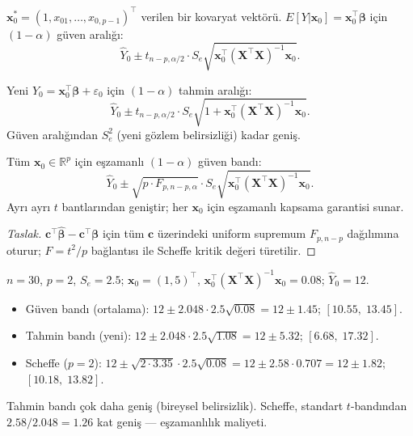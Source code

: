 \begin{tanim}\label{def:guven_bandi}
$\mathbf{x}_0^*=(1,x_{01},\ldots,x_{0,p-1})^\top$ verilen bir kovaryat vektörü. $E[Y|\mathbf{x}_0]=\mathbf{x}_0^\top\boldsymbol\beta$ için $(1-\alpha)$ güven aralığı:
\[
  \hat Y_0 \pm t_{n-p,\alpha/2}\cdot S_e\sqrt{\mathbf{x}_0^\top(\mathbf{X}^\top\mathbf{X})^{-1}\mathbf{x}_0}.
\]
\end{tanim}

\begin{tanim}\label{def:tahmin_bandi}
Yeni $Y_0=\mathbf{x}_0^\top\boldsymbol\beta+\varepsilon_0$ için $(1-\alpha)$ tahmin aralığı:
\[
  \hat Y_0 \pm t_{n-p,\alpha/2}\cdot S_e\sqrt{1+\mathbf{x}_0^\top(\mathbf{X}^\top\mathbf{X})^{-1}\mathbf{x}_0}.
\]
Güven aralığından $S_e^2$ (yeni gözlem belirsizliği) kadar geniş.
\end{tanim}

\begin{teorem}\label{thm:scheffe_guven}
Tüm $\mathbf{x}_0\in\mathbb{R}^p$ için eşzamanlı $(1-\alpha)$ güven bandı:
\[
  \hat Y_0 \pm \sqrt{p\cdot F_{p,n-p,\alpha}}\cdot S_e\sqrt{\mathbf{x}_0^\top(\mathbf{X}^\top\mathbf{X})^{-1}\mathbf{x}_0}.
\]
Ayrı ayrı $t$ bantlarından geniştir; her $\mathbf{x}_0$ için eşzamanlı kapsama garantisi sunar.
\end{teorem}

\begin{proof}[Taslak]
$\mathbf{c}^\top\hat{\boldsymbol\beta}-\mathbf{c}^\top\boldsymbol\beta$ için tüm $\mathbf{c}$ üzerindeki uniform supremum $F_{p,n-p}$ dağılımına oturur; $F=t^2/p$ bağlantısı ile Scheffe kritik değeri türetilir.
\end{proof}

\begin{ornek}
$n=30$, $p=2$, $S_e=2.5$; $\mathbf{x}_0=(1,5)^\top$, $\mathbf{x}_0^\top(\mathbf{X}^\top\mathbf{X})^{-1}\mathbf{x}_0=0.08$; $\hat Y_0=12$.
\begin{itemize}
  \item Güven bandı (ortalama): $12\pm2.048\cdot2.5\sqrt{0.08}=12\pm1.45$; $[10.55,\;13.45]$.
  \item Tahmin bandı (yeni): $12\pm2.048\cdot2.5\sqrt{1.08}=12\pm5.32$; $[6.68,\;17.32]$.
  \item Scheffe ($p=2$): $12\pm\sqrt{2\cdot3.35}\cdot2.5\sqrt{0.08}=12\pm2.58\cdot0.707=12\pm1.82$; $[10.18,\;13.82]$.
\end{itemize}
Tahmin bandı çok daha geniş (bireysel belirsizlik). Scheffe, standart $t$-bandından $2.58/2.048=1.26$ kat geniş --- eşzamanlılık maliyeti.
\end{ornek}

